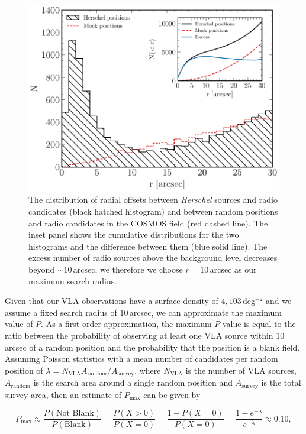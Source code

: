 \begin{figure}
	\centering
	\includegraphics[width=0.8\columnwidth]{Figures/optimal_radius.pdf}
	\caption[Distribution of radial offsets between \textit{Herschel} sources and radio objects]{The distribution of radial offsets between \textit{Herschel} sources and radio candidates (black hatched histogram) and between random positions and radio candidates in the COSMOS field (red dashed line). The inset panel shows the cumulative distributions for the two histograms and the difference between them (blue solid line). The excess number of radio sources above the background level decreases beyond $\sim10\,$arcsec, we therefore we choose $r = 10\,$arcsec as our maximum search radius.}
	\label{fig:optimal_radius}
\end{figure}

Given that our VLA observations have a surface density of $4,103\,$deg$^{-2}$ and we assume a fixed search radius of $10\,$arcsec, we can approximate the maximum value of $P$. As a first order approximation, the maximum $P$ value is equal to the ratio between the probability of observing at least one VLA source within $10\,$arcsec of a random position and the probability that the position is a blank field. Assuming Poisson statistics with a mean number of candidates per random position of $\lambda = N_{\textrm{VLA}}A_{\textrm{random}}/A_{\textrm{survey}}$, where $N_{\textrm{VLA}}$ is the number of VLA sources, $A_{\textrm{random}}$ is the search area around a single random position and $A_{\textrm{survey}}$ is the total survey area, then an estimate of $P_{\textrm{max}}$ can be given by

\begin{equation}
    P_{\textrm{max}} \approx \frac{P(\textrm{Not Blank})}{P(\textrm{Blank})} = \frac{P(X > 0)}{P(X = 0)} = \frac{1 - P(X = 0)}{P(X = 0)} = \frac{1 - e^{-\lambda}}{e^{-\lambda}} \approx 0.10,
\end{equation}

